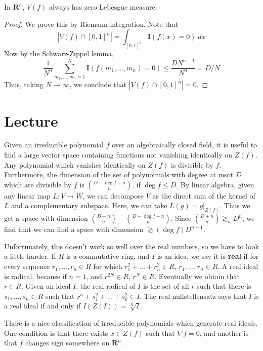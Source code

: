\begin{corollary}
	In $\mathbf{R}^n$, $V(f)$ always has zero Lebesgue measure.
\end{corollary}
\begin{proof}
	We prove this by Riemann integration. Note that
	\[ |V(f) \cap [0,1]^n| = \int_{[0,1]^n} \mathbf{I}(f(x) = 0)\; dx \]
	Now by the Schwarz-Zippel lemma,
	\[ \frac{1}{N^n} \sum_{m_1, \dots, m_n = 1}^N \mathbf{I}(f(m_1, \dots, m_n) = 0) \leq \frac{DN^{n-1}}{N^n} = D/N \]
	Thus, taking $N \to \infty$, we conclude that $|V(f) \cap [0,1]^n| = 0$.
\end{proof}

\chapter{Lecture}

Given an irreducible polynomial $f$ over an algebraically closed field, it is useful to find a large vector space containing functions not vanishing identically on $Z(f)$. Any polynomial which vanishes identically on $Z(f)$ is divisible by $f$. Furthermore, the dimension of the set of polynomials with degree at msot $D$ which are divisible by $f$ is ${{D - \deg f + n} \choose {n}}$, if $\deg f \leq D$. By linear algebra, given any linear map $L: V \to W$, we can decompose $V$ as the direct sum of the kernel of $L$ and a complementary subspace. Here, we can take $L(g) = g|_{Z(f)}$. Thus we get a space with dimension ${{D + n}\choose{n}} - {{D - \deg f + n}\choose{n}}$. Since ${{D + n} \choose {n}} \gtrsim_n D^n$, we find that we can find a space with dimension $\gtrsim (\deg f) D^{n-1}$.

Unfortunately, this doesn't work so well over the real numbers, so we have to look a little harder. If $R$ is a commutative ring, and $I$ is an idea, we say it is {\bf real} if for every sequence $r_1, \dots, r_n \in R$ for which $r_1^2 + \dots + r_n^2 \in R$, $r_1, \dots, r_n \in R$. A real ideal is radical, because if $n = 1$, and $r^{2N} \in R$, $r^N \in R$. Eventually we obtain that $r \in R$. Given an ideal $I$, the real radical of $I$ is the set of all $r$ such that there is $s_1, \dots, s_n \in R$ such that $r^n + s_1^2 + \dots + s_k^2 \in I$. The real nullstellensatz says that $I$ is a real ideal if and only if $I(Z(I)) = \sqrt[R]{I}$.

There is a nice classification of irreducible polynomials which generate real ideals. One condition is that there exists $x \in Z(f)$ such that $\nabla f = 0$, and another is that $f$ changes sign somewhere on $\mathbf{R}^n$.

